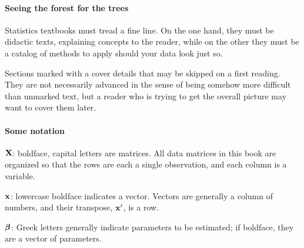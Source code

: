 \begin{multicols}{2}

\paragraph{\treesymbol Seeing the forest for the trees} Statistics textbooks
must tread a fine line. On the one hand, they must be didactic texts,
explaining concepts to the reader, while on the other they must be a
catalog of methods to apply should your data look just so.

Sections marked with a \ind{\treesymbol} cover details that may be
skipped on a first reading. They are not necessarily advanced
in the sense of being somehow more difficult than unmarked text, but a
reader who is trying to get the overall picture may want to cover them 
later. 

\paragraph{Some notation}  \hfill

${\bf X}$: boldface, capital letters are matrices. All data matrices in this
book are organized so that the rows are each a single observation, and
each column is a variable.

${\bf x}$: lowercase boldface indicates a vector. Vectors are generally a
column of numbers, and their transpose, ${\bf x}'$, is a row.

${\mbox{\boldmath$\beta$}}$: Greek letters generally indicate parameters to be estimated;
if boldface, they are a vector of parameters.












\end{multicols}
